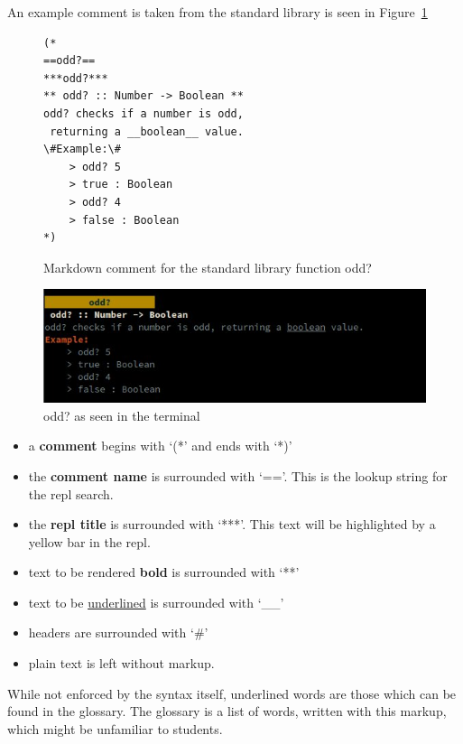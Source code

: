 An example comment is taken from the standard library is seen in Figure~\ref{fig:odd}

\begin{figure}
    \begin{verbatim}
(*
==odd?==
***odd?***
** odd? :: Number -> Boolean **
odd? checks if a number is odd, 
 returning a __boolean__ value.
\#Example:\#
    > odd? 5
    > true : Boolean
    > odd? 4
    > false : Boolean
*)
    \end{verbatim}
    \caption{Markdown comment for the standard library function odd?}
\label{fig:odd}
\end{figure}

\begin{figure}
    \includegraphics[width=\textwidth]{images/odd.jpg}
    \caption{odd? as seen in the terminal}
\label{fig:oddterm}
\end{figure}

\begin{itemize}
    \item a \textbf{comment} begins with `(*' and ends with `*)'
    \item the \textbf{comment name} is surrounded with `=='. This is the lookup string for the repl
        search.
    \item the \textbf{repl title} is surrounded with `***'. This text will be highlighted by a yellow
        bar in the repl.
    \item text to be rendered \textbf{bold} is surrounded with `**'
    \item text to be \underline{underlined} is surrounded with `__'
    \item headers are surrounded with `\#' 
    \item plain text is left without markup.
\end{itemize}

While not enforced by the syntax itself, underlined words are those which can be found in the
glossary. The glossary is a list of words, written with this markup, which might be unfamiliar to
students.

